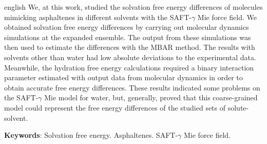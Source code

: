 \documentclass[
	12pt,				%
	openany,			%
	oneside,			%
	a4paper,			%
	english,			%
	brazil				%
	]{abntex2}
\begin{document}
\begin{resumo}[Abstract]
 \begin{otherlanguage*}{english}
  We, at this work, studied the solvation free energy differences of molecules mimicking asphaltenes in different solvents with the SAFT-$\gamma$ Mie force field. We obtained solvation free energy differences by carrying out molecular dynamics simulations at the expanded ensemble. The output from these simulations was then used to estimate the differences with the MBAR method. The results with solvents other than water had low absolute deviations to the experimental data. Meanwhile, the hydration free energy calculations required a binary interaction parameter estimated with output data from molecular dynamics in order to obtain accurate free energy differences. These results indicated some problems on the SAFT-$\gamma$ Mie model for water, but, generally, proved that this coarse-grained model could represent the free energy differences of the studied sets of solute-solvent.

   \vspace{\onelineskip}
 
   \noindent 
   \textbf{Keywords}: Solvation free energy. Asphaltenes. SAFT-$\gamma$ Mie force field.
 \end{otherlanguage*}
\end{resumo}

\listoffigures*
\cleardoublepage

\listoftables*
\cleardoublepage
\end{document}
